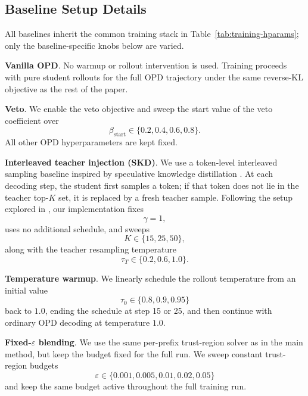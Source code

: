 \documentclass{llmxive}
\providecommand{\paragraph}[1]{\vspace{1mm}\noindent\textbf{#1}.}
\begin{document}
\subsection{Baseline Setup Details}
\label{app:baseline_setups}

All baselines inherit the common training stack in Table~\ref{tab:training-hparams}; only the baseline-specific knobs below are varied.

\paragraph{Vanilla OPD}
No warmup or rollout intervention is used.
Training proceeds with pure student rollouts for the full OPD trajectory under the same reverse-KL objective as the rest of the paper.

\paragraph{Veto}
We enable the veto objective \citep{veto} and sweep the start value of the veto coefficient over
\[
\beta_{\mathrm{start}} \in \{0.2, 0.4, 0.6, 0.8\}.
\]
All other OPD hyperparameters are kept fixed.

\paragraph{Interleaved teacher injection (SKD)}
We use a token-level interleaved sampling baseline inspired by speculative knowledge distillation \citep{skd}.
At each decoding step, the student first samples a token; if that token does not lie in the teacher top-$K$ set, it is replaced by a fresh teacher sample.
Following the setup explored in \citet{skd}, our implementation fixes
\[
 \gamma = 1,
\]
uses no additional schedule, and sweeps
\[
K \in \{15,25,50\},
\]
along with the teacher resampling temperature
\[
\tau_T \in \{0.2, 0.6, 1.0\}.
\]

\paragraph{Temperature warmup}
We linearly schedule the rollout temperature from an initial value
\[
\tau_0 \in \{0.8, 0.9, 0.95\}
\]
back to $1.0$, ending the schedule at step 15 or 25, and then continue with ordinary OPD decoding at temperature $1.0$.

\paragraph{Fixed-\texorpdfstring{$\varepsilon$}{...} blending}
We use the same per-prefix trust-region solver as in the main method, but keep the budget fixed for the full run.
We sweep constant trust-region budgets
\[
\varepsilon \in \{0.001, 0.005, 0.01, 0.02, 0.05\}
\]
and keep the same budget active throughout the full training run.
\end{document}
